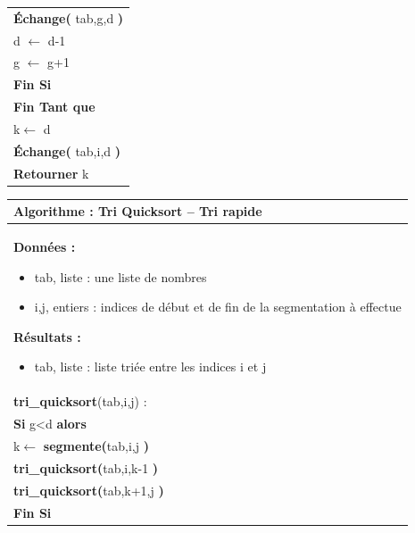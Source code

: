 \documentclass[10pt]{article}
\begin{document}
\begin{pseudo}
\begin{center}
\begin{tabular}{p{}}
\hspace{1.2cm} \textbf{Échange(} \textsf{tab,g,d} \textbf{)} \\
\hspace{1.2cm} \textsf{d $\leftarrow$ d-1}\\  
\hspace{1.2cm} \textsf{g $\leftarrow$ g+1}\\  
\hspace{.8cm} \textbf{Fin Si} \\
\hspace{.4cm} \textbf{Fin Tant que}  \\
\hspace{.4cm} \textsf{k$\leftarrow$ d}  \\
\hspace{.4cm} \textbf{Échange(} \textsf{tab,i,d} \textbf{)} \\
\hspace{.4cm} \textbf{Retourner} \textsf{k}  \\
\hline
\end{tabular}
\end{center}


\begin{center}
\begin{tabular}{p{}}
\hline
\textbf{Algorithme :} Tri Quicksort -- Tri rapide\\
\hline
\textbf{Données :}
\begin{itemize}
\item \textsf{tab}, liste : une liste de nombres
\item \textsf{i,j}, entiers : indices de début et de fin de la segmentation à effectue
\end{itemize}
\textbf{Résultats :} 
\begin{itemize}
\item \textsf{tab}, liste : liste triée entre les indices \textsf{i} et \textsf{j}
\end{itemize}
\\
\textbf{tri\_quicksort}(\textsf{tab,i,j}) :\\
\hspace{.4cm} \textbf{Si} \textsf{g<d} \textbf{alors} \\
\hspace{.8cm} \textsf{k$\leftarrow$} \textbf{segmente(}\textsf{tab,i,j} \textbf{)} \\
\hspace{.8cm} \textbf{tri\_quicksort(}\textsf{tab,i,k-1} \textbf{)} \\
\hspace{.8cm} \textbf{tri\_quicksort(}\textsf{tab,k+1,j} \textbf{)} \\
\hspace{.4cm} \textbf{Fin Si} \\
\hline
\end{tabular}
\end{center}

\end{pseudo}
\end{document}
